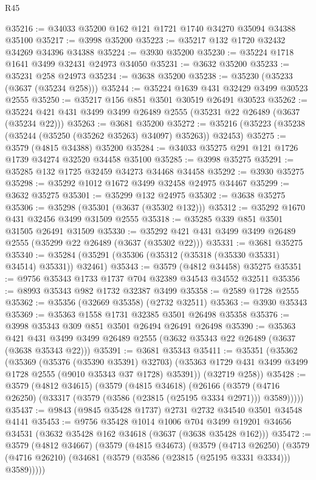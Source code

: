 \begin{lexlean}{R45}
\begin{coremodule}
@35216 := @34033 @35200 @162 @121 @1721 @1740 @34270 @35094 @34388 @35100
@35217 := @3998 @35200
@35223 := @35217 @132 @1720 @32432 @34269 @34396 @34388
@35224 := @3930 @35200
@35230 := @35224 @1718 @1641 @3499 @32431 @24973 @34050
@35231 := @3632 @35200
@35233 := @35231 @258 @24973
@35234 := @3638 @35200
@35238 := @35230 (@35233 (@3637 (@35234 @258)))
@35244 := @35224 @1639 @431 @32429 @3499 @30523 @2555
@35250 := @35217 @156 @851 @3501 @30519 @26491 @30523
@35262 := @35224 @421 @431 @3499 @3499 @26489 @2555 (@35231 @22 @26489 (@3637 (@35234 @22)))
@35263 := @3681 @35200
@35272 := @35216 (@35223 (@35238 (@35244 (@35250 (@35262 @35263) @34097) @35263)) @32453)
@35275 := @3579 (@4815 @34388) @35200
@35284 := @34033 @35275 @291 @121 @1726 @1739 @34274 @32520 @34458 @35100
@35285 := @3998 @35275
@35291 := @35285 @132 @1725 @32459 @34273 @34468 @34458
@35292 := @3930 @35275
@35298 := @35292 @1012 @1672 @3499 @32458 @24975 @34467
@35299 := @3632 @35275
@35301 := @35299 @132 @24975
@35302 := @3638 @35275
@35306 := @35298 (@35301 (@3637 (@35302 @132)))
@35312 := @35292 @1670 @431 @32456 @3499 @31509 @2555
@35318 := @35285 @339 @851 @3501 @31505 @26491 @31509
@35330 := @35292 @421 @431 @3499 @3499 @26489 @2555 (@35299 @22 @26489 (@3637 (@35302 @22)))
@35331 := @3681 @35275
@35340 := @35284 (@35291 (@35306 (@35312 (@35318 (@35330 @35331) @34514) @35331)) @32461)
@35343 := @3579 (@4812 @34458) @35275
@35351 := @9756 @35343 @1733 @1737 @704 @32389 @34543 @34552 @32511
@35356 := @8993 @35343 @982 @1732 @32387 @3499
@35358 := @2589 @1728 @2555
@35362 := @35356 (@32669 @35358) (@2732 @32511)
@35363 := @3930 @35343
@35369 := @35363 @1558 @1731 @32385 @3501 @26498 @35358
@35376 := @3998 @35343 @309 @851 @3501 @26494 @26491 @26498
@35390 := @35363
    @421
    @431
    @3499
    @3499
    @26489
    @2555
    (@3632 @35343 @22 @26489 (@3637 (@3638 @35343 @22)))
@35391 := @3681 @35343
@35411 := @35351
    (@35362
      (@35369
        (@35376 (@35390 @35391) @32703)
        (@35363 @1729 @431 @3499 @3499 @1728 @2555 (@9010 @35343 @37 @1728) @35391))
      (@32719 @258))
@35428 := @3579
    (@4812 @34615)
    (@3579
      (@4815 @34618)
      (@26166 (@3579 (@4716 @26250) (@33317 (@3579 (@3586 (@23815 (@25195 @3334 @2971))) @3589)))))
@35437 := @9843 (@9845 @35428 @1737) @2731 @2732 @34540 @3501 @34548 @4141
@35453 := @9756
    @35428
    @1014
    @1006
    @704
    @3499
    @19201
    @34656
    @34531
    (@3632 @35428 @162 @34618 (@3637 (@3638 @35428 @162)))
@35472 := @3579
    (@4812 @34667)
    (@3579
      (@4815 @34673)
      (@3579
        (@4713 @26250)
        (@3579 (@4716 @26210) (@34681 (@3579 (@3586 (@23815 (@25195 @3331 @3334))) @3589)))))

\end{coremodule}
\end{lexlean}
